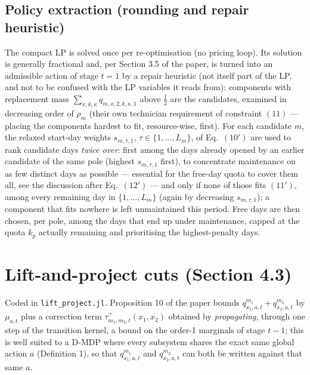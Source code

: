 \documentclass[11pt]{article}
\begin{document}
\subsection*{Policy extraction (rounding and repair heuristic)}
The compact LP is solved once per re-optimisation (no pricing loop). Its solution is
generally fractional and, per Section 3.5 of the paper, is turned into an admissible
action of stage $t=1$ by a repair heuristic (not itself part of the LP, and not to be
confused with the LP variables it reads from): components with replacement mass
$\sum_{x,k,\kappa} q_{m,x,2,k,\kappa,1}$ above $\tfrac12$ are the candidates, examined in
decreasing order of $\rho_m$ (their own technician requirement of constraint $(11)$ ---
placing the components hardest to fit, resource-wise, first). For each candidate $m$, the
relaxed start-day weights $s_{m,\tau,1}$, $\tau \in \{1,\dots,L_m\}$, of Eq.~$(10')$ are
used to rank candidate days \emph{twice over}: first among the days already opened by an
earlier candidate of the same pole (highest $s_{m,\tau,1}$ first), to concentrate
maintenance on as few distinct days as possible --- essential for the free-day quota to
cover them all, see the discussion after Eq.~$(12')$ --- and only if none of those fits
$(11')$, among every remaining day in $\{1,\dots,L_m\}$ (again by decreasing
$s_{m,\tau,1}$); a component that fits nowhere is left unmaintained this period. Free days
are then chosen, per pole, among the days that end up under maintenance, capped at the
quota $k_p$ actually remaining and prioritising the highest-penalty days.

\section{Lift-and-project cuts (Section 4.3)}
\label{sec:lift-project}

Coded in \texttt{lift\_project.jl}. Proposition 10 of the paper bounds
$q^{m_1}_{x_1,a,t} + q^{m_2}_{x_2,a,t}$ by $\mu_{a,t}$ plus a correction term
$\tau^+_{m_1,m_2,t}(x_1,x_2)$ obtained by \emph{propagating}, through one step of the
transition kernel, a bound on the order-1 marginals of stage $t-1$; this is well suited to
a D-MDP where every subsystem shares the exact same global action $a$ (Definition 1), so
that $q^{m_1}_{x_1,a,t}$ and $q^{m_2}_{x_2,a,t}$ can both be written against that same $a$.
\end{document}
